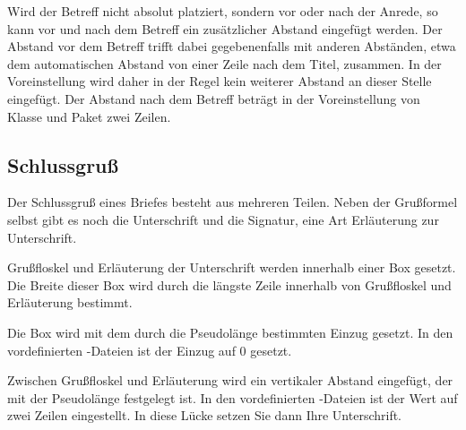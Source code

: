 \begin{Declaration}
\end{Declaration}
%
Wird der Betreff nicht absolut platziert, sondern vor oder nach der Anrede, so
kann vor und nach dem Betreff ein zusätzlicher Abstand eingefügt werden. Der
Abstand vor dem Betreff trifft dabei gegebenenfalls mit anderen Abständen,
etwa dem automatischen Abstand von einer Zeile nach dem Titel, zusammen. In
der Voreinstellung wird daher in der Regel kein weiterer Abstand an dieser
Stelle eingefügt. Der Abstand nach dem Betreff beträgt in der Voreinstellung
von Klasse und Paket zwei Zeilen.%
\EndIndexGroup \EndIndexGroup


\subsection{Schlussgruß}
\BeginIndexGroup
{}

Der Schlussgruß eines Briefes besteht aus mehreren Teilen.
Neben der Grußformel selbst gibt es noch die Unterschrift und die Signatur,
eine Art Erläuterung zur Unterschrift.


\begin{Declaration}
\end{Declaration}
Grußfloskel und Erläuterung der
Unterschrift werden innerhalb einer Box gesetzt.  Die
Breite dieser Box wird durch die längste Zeile innerhalb von Grußfloskel und
Erläuterung bestimmt.

Die Box wird mit dem durch die Pseudolänge  bestimmten
Einzug gesetzt. In den vordefinierten -Dateien ist der Einzug auf
0 gesetzt.

Zwischen Grußfloskel und Erläuterung wird ein vertikaler Abstand eingefügt,
der mit der Pseudolänge  festgelegt ist. In den
vordefinierten -Dateien ist der Wert auf zwei Zeilen eingestellt. In
diese Lücke setzen Sie dann Ihre Unterschrift.%
\iffalse%
\ Sollten\textnote{Tipp!} Sie sich dazu entschließen in die Variable
\DescRef{scrlttr2.variable.signature}\IndexVariable{signature}%
\important{\DescRef{scrlttr2.variable.signature}} mit Paket
\Package{graphicx}\IndexPackage{graphicx} ein Faksimile Ihrer Unterschrift
einzufügen, wäre es also sinnvoll den Wert von \PLength{sigbeforevskip} und
damit die Lücke zwischen Schlussgruß und Signatur zu verringern.%
\fi%
\EndIndexGroup
%
\EndIndexGroup



